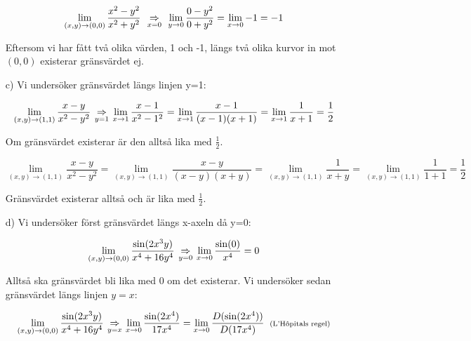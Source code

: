 \documentclass{article}
\begin{document}
\begin{enumerate}
        \vskip 0.2cm

        $$
        \mathop\mathrm{lim}_{(x, y)\to(0, 0)}{\frac{x^2-y^2}{x^2+y^2}}\;
        \underset{x=0}{\ \Rightarrow \ }\;
        \mathop\mathrm{lim}_{y\to0}{\frac{0-y^2}{0+y^2}}
        =
        \mathop\mathrm{lim}_{x\to0}{-1}
        =
        -1
        $$

        \vskip 0.2cm

        Eftersom vi har fått två olika värden, 1 och -1, längs två olika kurvor in mot $(0, 0)$ existerar gränsvärdet ej. 

        \vskip 0.3cm
        
    \item[c)] Vi undersöker gränsvärdet längs linjen y=1:

        \vskip 0.1cm

        $$
        \mathop\mathrm{lim}_{(x, y)\to(1, 1)}{\frac{x-y}{x^2-y^2}}
        \underset{y=1}{\ \Rightarrow \ }
        \mathop\mathrm{lim}_{x\to1}{\frac{x-1}{x^2-1^2}}
        =
        \mathop\mathrm{lim}_{x\to1}{\frac{x-1}{(x-1)(x+1)}}
        =
        \mathop\mathrm{lim}_{x\to1}{\frac{1}{x+1}}
        =
        \frac{1}{2}
        $$

        \newpage

        Om gränsvärdet existerar är den alltså lika med $\frac{1}{2}$.

        \vskip -0.4cm

        $$
        \lim_{(x, y)\to(1, 1)}{\frac{x-y}{x^2-y^2}}
        =
        \lim_{(x, y)\to(1, 1)}{\frac{x-y}{(x-y)(x+y)}}
        =
        \lim_{(x, y)\to(1, 1)}{\frac{1}{x+y}}
        =
        \lim_{(x, y)\to(1, 1)}{\frac{1}{1+1}}
        =
        \frac{1}{2}
        $$

        \vskip 0.2cm

        Gränsvärdet existerar alltså och är lika med $\frac{1}{2}$.

        \vskip 0.3cm

    \item[d)] Vi undersöker först gränsvärdet längs x-axeln då y=0:

        $$
        \mathop\mathrm{lim}_{(x, y)\to(0, 0)}{\frac{\mathop\mathrm{sin}\nolimits(2x^3y)}{x^4+16y^4}}
        \underset{y=0}{\ \Rightarrow \ }
        \mathop\mathrm{lim}_{x\to0}{\frac{\mathop\mathrm{sin}\nolimits(0)}{x^4}}
        =
        0
        $$

        Alltså ska gränsvärdet bli lika med 0 om det existerar. Vi undersöker sedan gränsvärdet längs linjen $y=x$:

        \vskip 0.1cm

        $$
        \mathop\mathrm{lim}_{(x, y)\to(0, 0)}{\frac{\mathop\mathrm{sin}\nolimits(2x^3y)}{x^4+16y^4}}
        \underset{y=x}{\ \Rightarrow \ }
        \mathop\mathrm{lim}_{x\to0}{\frac{\mathop\mathrm{sin}\nolimits(2x^4)}{17x^4}}
        =
        \mathop\mathrm{lim}_{x\to0}{\frac{D(\mathop\mathrm{sin}\nolimits(2x^4))}{D(17x^4)}} \;\; \text{\scriptsize(L'Hôpitals regel)}
        $$


\end{enumerate}
\end{document}
